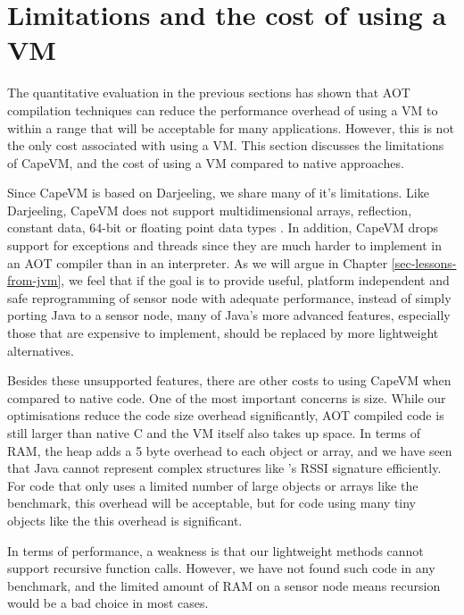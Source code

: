 \section{Limitations and the cost of using a VM}
\label{sec-evaluation-limitations}
The quantitative evaluation in the previous sections has shown that AOT compilation techniques can reduce the performance overhead of using a VM to within a range that will be acceptable for many applications. However, this is not the only cost associated with using a VM. This section discusses the limitations of CapeVM, and the cost of using a VM compared to native approaches.

Since CapeVM is based on Darjeeling, we share many of it's limitations. Like Darjeeling, CapeVM does not support multidimensional arrays, reflection, constant data, 64-bit or floating point data types \cite{Brouwers:2009cj}. In addition, CapeVM drops support for exceptions and threads since they are much harder to implement in an AOT compiler than in an interpreter. As we will argue in Chapter \ref{sec-lessons-from-jvm}, we feel that if the goal is to provide useful, platform independent and safe reprogramming of sensor node with adequate performance, instead of simply porting Java to a sensor node, many of Java's more advanced features, especially those that are expensive to implement, should be replaced by more lightweight alternatives.

Besides these unsupported features, there are other costs to using CapeVM when compared to native code. One of the most important concerns is size. While our optimisations reduce the code size overhead significantly, AOT compiled code is still larger than native C and the VM itself also takes up space. In terms of RAM, the heap adds a 5 byte overhead to each object or array, and we have seen that Java cannot represent complex structures like 's RSSI signature efficiently. For code that only uses a limited number of large objects or arrays like the  benchmark, this overhead will be acceptable, but for code using many tiny objects like the  this overhead is significant.

In terms of performance, a weakness is that our lightweight methods cannot support recursive function calls. However, we have not found such code in any benchmark, and the limited amount of RAM on a sensor node means recursion would be a bad choice in most cases.

